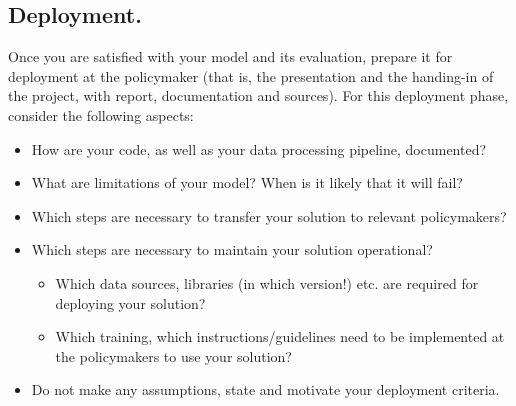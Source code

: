 \subsection{Deployment.}
Once you are satisfied with your model and its evaluation, prepare it for deployment at the policymaker (that is, the presentation and the handing-in of the project, with report, documentation and sources). For this deployment phase, consider the following aspects:
\begin{itemize}
  \setlength\itemsep{0em}
  \item How are your code, as well as your data processing pipeline, documented?
  \item What are limitations of your model? When is it likely that it will fail?
  \item Which steps are necessary to transfer your solution to relevant policymakers?
  \item Which steps are necessary to maintain your solution operational?
  \begin{itemize}
    \item Which data sources, libraries (in which version!) etc. are required for deploying your solution?
    \item Which training, which instructions/guidelines need to be implemented at the policymakers to use your solution?
  \end{itemize}
  \item Do not make any assumptions, state and motivate your deployment criteria.
\end{itemize}
